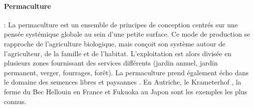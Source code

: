\documentclass[../thesis.tex]{subfiles}
\begin{document}
    \paragraph{Permaculture} : La permaculture est un ensemble de principes de conception centrés sur une pensée systémique globale au sein d'une petite surface. Ce mode de production se rapproche de l'agriculture biologique, mais conçoit son système autour de l'agriculteur, de la famille et de l'habitat. L'exploitation est alors divisée en plusieurs zones fournissant des services différents (jardin annuel, jardin permanent, verger, fourrages, forêt). La permaculture prend également écho dans le domaine des semences libres et paysannes \cite{shiva2005globalization, mesini2006preservation, zerbib2018relations, ElAmine2018}. En Autriche, le Krameterhof  \cite{holzer2011sepp}, la ferme du Bec Hellouin en France \cite{mesini2006preservation} et Fukuoka au Japon \cite{fukuoka1983revolution} sont les exemples les plus connus.
    
    
    
\end{document}
